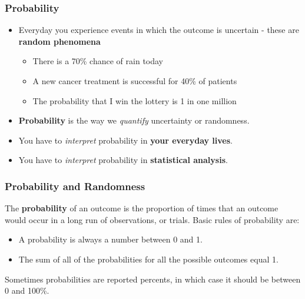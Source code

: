 \begin{frame}
\frametitle{Probability}
\begin{itemize}
    \item
    Everyday you experience events in which the outcome is uncertain - these are \textbf{random phenomena}
        \begin{itemize}
            \item
            There is a 70\% chance of rain today
            \item
            A new cancer treatment is successful for 40\% of patients
            \item
            The probability that I win the lottery is 1 in one million
        \end{itemize}
    \item
    \textbf{Probability} is the way we \emph{quantify} uncertainty or randomness.
    \item
    You have to \emph{interpret} probability in \textbf{your everyday lives}.
    \item
    You have to \emph{interpret} probability in \textbf{statistical analysis}.
\end{itemize}
\end{frame}

\begin{frame}
\frametitle{Probability and Randomness}
The \textbf{probability} of an outcome is the proportion of times that an outcome would occur in a long run of observations, or trials.
    Basic rules of probability are:
    \begin{itemize}
        \item
         A probability is always a number between 0 and 1.
         \item
         The sum of all of the probabilities for all the possible outcomes equal 1.
    \end{itemize}
\vskip10pt
Sometimes probabilities are reported percents, in which case it should be between 0 and 100\%.
\end{frame}


